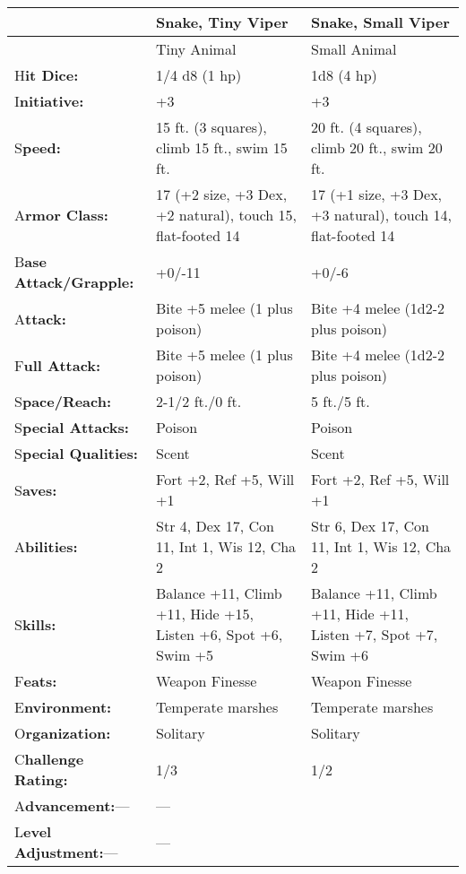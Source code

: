 \documentclass{article}
\begin{document}
\begin{tabular}{|>{\raggedright}p{57pt}|>{\raggedright}p{128pt}|>{\raggedright}p{128pt}|}
\hline
  & S\textbf{nake, Tiny Viper } & S\textbf{nake, Small Viper}\tabularnewline
\hline
  & Tiny Animal & Small Animal\tabularnewline
\hline
H\textbf{it Dice:} & 1/4 d8 (1 hp) & 1d8 (4 hp)\tabularnewline
\hline
I\textbf{nitiative:} & +3 & +3\tabularnewline
\hline
S\textbf{peed:} & 15 ft. (3 squares), climb 15 ft., swim 15 ft. & 20 ft. (4 squares), 
climb 20 ft., swim 20 ft.\tabularnewline
\hline
A\textbf{rmor Class:} & 17 (+2 size, +3 Dex, +2 natural), touch 15, flat-footed 
14 & 17 (+1 size, +3 Dex, +3 natural), touch 14, flat-footed 14\tabularnewline
\hline
B\textbf{ase Attack/Grapple:} & +0/-11 & +0/-6\tabularnewline
\hline
A\textbf{ttack:} & Bite +5 melee (1 plus poison) & Bite +4 melee (1d2-2 plus poison)\tabularnewline
\hline
F\textbf{ull Attack:} & Bite +5 melee (1 plus poison) & Bite +4 melee (1d2-2 plus 
poison)\tabularnewline
\hline
S\textbf{pace/Reach:} & 2-1/2 ft./0 ft. & 5 ft./5 ft.\tabularnewline
\hline
S\textbf{pecial Attacks:} & Poison & Poison\tabularnewline
\hline
S\textbf{pecial Qualities:} & Scent & Scent\tabularnewline
\hline
S\textbf{aves:} & Fort +2, Ref +5, Will +1 & Fort +2, Ref +5, Will +1\tabularnewline
\hline
A\textbf{bilities:} & Str 4, Dex 17, Con 11, Int 1, Wis 12, Cha 2 & Str 6, Dex 
17, Con 11, Int 1, Wis 12, Cha 2\tabularnewline
\hline
S\textbf{kills:} & Balance +11, Climb +11, Hide +15, Listen +6, Spot +6, Swim +5 & Balance 
+11, Climb +11, Hide +11, Listen +7, Spot +7, Swim +6\tabularnewline
\hline
F\textbf{eats:} & Weapon Finesse & Weapon Finesse\tabularnewline
\hline
E\textbf{nvironment:} & Temperate marshes & Temperate marshes\tabularnewline
\hline
O\textbf{rganization:} & Solitary & Solitary\tabularnewline
\hline
C\textbf{hallenge Rating:} & 1/3 & 1/2\tabularnewline
\hline
A\textbf{dvancement:}--- & --- & \tabularnewline
\hline
L\textbf{evel Adjustment:}--- & --- & \tabularnewline
\hline
\end{tabular}
\end{document}
